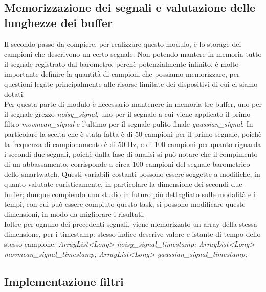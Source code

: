\documentclass[a4paper, oneside]{book}
\begin{document}
\subsection{Memorizzazione dei segnali e valutazione delle lunghezze dei buffer}
Il secondo passo da compiere, per realizzare questo modulo, è lo storage dei campioni che descrivono un certo segnale. Non potendo mantere in memoria tutto il segnale registrato dal barometro, perchè potenzialmente infinito, è molto importante definire la quantità di campioni che possiamo memorizzare, per questioni legate principalmente alle risorse limitate dei dispositivi di cui ci siamo dotati. \\
Per questa parte di modulo è necessario mantenere in memoria tre buffer, uno per il segnale grezzo \textit{noisy\_signal}, uno per il segnale a cui viene applicato il primo filtro \textit{movmean\_signal} e l'ultimo per il segnale pulito finale \textit{gaussian\_signal}. In particolare la scelta che è stata fatta è di 50 campioni per il primo segnale, poichè la frequenza di campionamento è di 50 Hz, e di 100 campioni per quanto riguarda i secondi due segnali, poichè dalla fase di analisi si può notare che il compimento di un abbassamento, corrisponde a circa 100 campioni del segnale barometrico dello smartwatch. Questi variabili costanti possono essere soggette a modifiche, in quanto valutate euristicamente, in particolare la dimensione dei secondi due buffer; dunque compiendo uno studio in futuro più dettagliato sulle modalità e i tempi, con cui può essere compiuto questo task, si possono modificare queste dimensioni, in modo da migliorare i risultati. \\
 
\vspace{3mm}
Ioltre per ognuno dei precedenti segnali, viene memorizzato un array della stessa dimensione, per i timestamp: stesso indice descrive valore e istante di tempo dello stesso campione: \textit{ArrayList<Long> noisy\_signal\_timestamp; ArrayList<Long> movmean\_signal\_timestamp; ArrayList<Long> gaussian\_signal\_timestamp;}

\subsection{Implementazione filtri}
\vspace{2mm}

\vspace{5mm}

\end{document}
